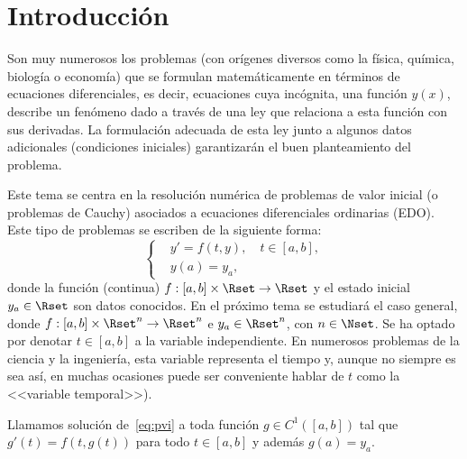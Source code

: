 \renewcommand{\tt}{t}
\newcommand{\yy}{y}
\newcommand{\yn}{{\yy_n}}
\newcommand{\ynn}{{\yy_{n+1}}}
\newcommand{\ta}{a}
\newcommand{\tb}{b}
\newcommand{\tn}{{\tt_n}}
\newcommand{\tnn}{{\tt_{n+1}}}
\newcommand{\zn}{{z_n}}
\newcommand{\znn}{{z_{n+1}}}
\newcommand{\ycero}{{y_a}}
\newcommand{\sol}{g}
\newcommand{\lipschitz}{$y$--Lipschitz\xspace}
\newcommand{\locLipschitz}{localmente \lipschitz}
\newcommand{\globLipschitz}{\lipschitz}
\newcommand{\errCons}{{\cal E}}
\newcommand{\RK}{Runge--Kutta\xspace}
\newcommand{\AB}{Adams--Bashforth\xspace}
\newcommand{\AM}{Adams--Moulton\xspace}


\section{Introducción}

Son muy numerosos los problemas (con orígenes diversos como la física,
química, biología o economía) que se formulan matemáticamente en
términos de ecuaciones diferenciales, es decir, ecuaciones cuya
incógnita, una función $y(x)$, describe un fenómeno dado a través de
una ley que relaciona a esta función con sus derivadas. La formulación
adecuada de esta ley junto a algunos datos adicionales (condiciones
iniciales) garantizarán el buen planteamiento del problema.

Este tema se centra en la resolución numérica de problemas de valor
inicial (o problemas de Cauchy) asociados a ecuaciones diferenciales
ordinarias (EDO). Este tipo de problemas se escriben de la siguiente
forma:
\begin{equation}
  \label{eq:pvi}
  \tag{PVI}
  \left\{
  \begin{aligned}
    &y' = f(\tt,\yy), \quad \tt\in[\ta,\tb],
    \\
    &y(\ta) = \ycero,
  \end{aligned}
  \right.
\end{equation}
donde la función (continua) $f:[\ta,\tb]\times\Rset\to\Rset$ y el
estado inicial $\ycero\in\Rset$ son datos conocidos. En el próximo
tema se estudiará el caso general, donde
$f:[\ta,\tb]\times\Rset^n\to\Rset^n$ e $\ycero\in\Rset^n$, con
$n\in\Nset$. Se ha optado por denotar $t\in [a,b]$ a la variable
independiente.  En numerosos problemas de la ciencia y la ingeniería,
esta variable representa el tiempo y, aunque no siempre es
sea así, en muchas ocasiones puede ser conveniente
hablar de $\tt$ como la <<variable temporal>>).

\begin{definition}
  \label{def:sol-pvi}
  Llamamos solución de~\eqref{eq:pvi} a toda función $\sol\in
  C^1([\ta,\tb])$ tal que $\sol'(\tt)=f(\tt,\sol(\tt))$ para todo
  $\tt\in[\ta,\tb]$ y además $\sol(\ta)=\ycero$.\label{def:3}
\end{definition}

